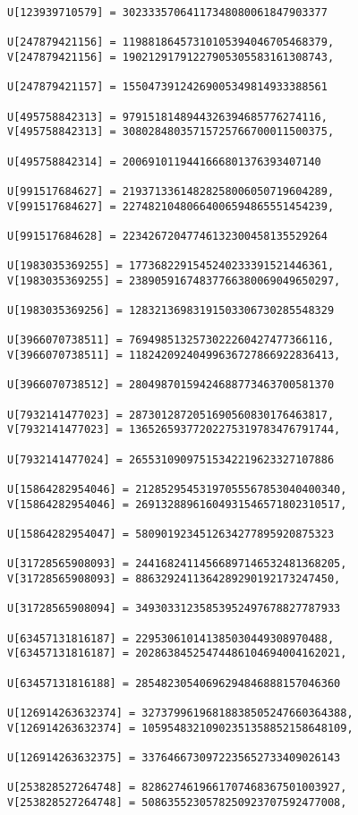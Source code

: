 \documentclass[a4paper]{article}
\begin{document}
\begin{verbatim}
U[123939710579] = 30233357064117348080061847903377

U[247879421156] = 11988186457310105394046705468379, 
V[247879421156] = 19021291791227905305583161308743, 

U[247879421157] = 15504739124269005349814933388561

U[495758842313] = 9791518148944326394685776274116, 
V[495758842313] = 30802848035715725766700011500375, 

U[495758842314] = 2006910119441666801376393407140

U[991517684627] = 21937133614828258006050719604289, 
V[991517684627] = 22748210480664006594865551454239, 

U[991517684628] = 22342672047746132300458135529264

U[1983035369255] = 1773682291545240233391521446361, 
V[1983035369255] = 23890591674837766380069049650297, 

U[1983035369256] = 12832136983191503306730285548329

U[3966070738511] = 7694985132573022260427477366116, 
V[3966070738511] = 11824209240499636727866922836413, 

U[3966070738512] = 28049870159424688773463700581370

U[7932141477023] = 2873012872051690560830176463817, 
V[7932141477023] = 13652659377202275319783476791744, 

U[7932141477024] = 26553109097515342219623327107886

U[15864282954046] = 21285295453197055567853040400340, 
V[15864282954046] = 26913288961604931546571802310517, 

U[15864282954047] = 5809019234512634277895920875323

U[31728565908093] = 24416824114566897146532481368205, 
V[31728565908093] = 8863292411364289290192173247450, 

U[31728565908094] = 34930331235853952497678827787933

U[63457131816187] = 229530610141385030449308970488, 
V[63457131816187] = 20286384525474486104694004162021, 

U[63457131816188] = 28548230540696294846888157046360

U[126914263632374] = 32737996196818838505247660364388, 
V[126914263632374] = 10595483210902351358852158648109, 

U[126914263632375] = 3376466730972235652733409026143

U[253828527264748] = 8286274619661707468367501003927, 
V[253828527264748] = 5086355230578250923707592477008, 


\end{verbatim}
\end{document}
